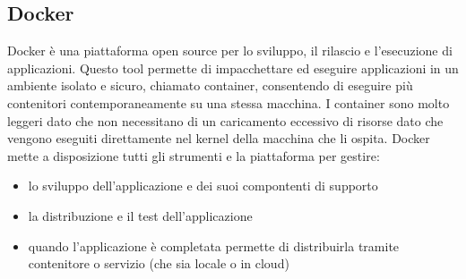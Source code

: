 \subsection{Docker}
Docker è una piattaforma open source per lo sviluppo, il rilascio e l'esecuzione di applicazioni. Questo tool permette di impacchettare ed eseguire applicazioni in un ambiente isolato e sicuro, chiamato container, consentendo di eseguire più contenitori contemporaneamente su una stessa macchina. I container sono molto leggeri dato che non necessitano di un caricamento eccessivo di risorse dato che vengono eseguiti direttamente nel kernel della macchina che li ospita. Docker mette a disposizione tutti gli strumenti e la piattaforma per gestire:
\begin{itemize}
    \item lo sviluppo dell'applicazione e dei suoi compontenti di supporto
    \item la distribuzione e il test dell'applicazione
    \item quando l'applicazione è completata permette di distribuirla tramite contenitore o servizio (che sia locale o in cloud)
\end{itemize}